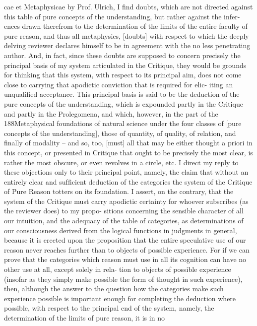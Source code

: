cae et Metaphysicae by Prof. Ulrich, I ﬁnd doubts, which are not directed against
this table of pure concepts of the understanding, but rather against the infer-
ences drawn therefrom to the determination of the limits of the entire faculty
of pure reason, and thus all metaphysics, [doubts] with respect to which the
deeply delving reviewer declares himself to be in agreement with the no less
penetrating author. And, in fact, since these doubts are supposed to concern
precisely the principal basis of my system articulated in the Critique, they would
be grounds for thinking that this system, with respect to its principal aim, does
not come close to carrying that apodictic conviction that is required for elic-
iting an unqualiﬁed acceptance. This principal basis is said to be the deduction
of the pure concepts of the understanding, which is expounded partly in the
Critique and partly in the Prolegomena, and which, however, in the part of the
188Metaphysical foundations of natural science
under the four classes of [pure concepts of the understanding], those of
quantity, of quality, of relation, and ﬁnally of modality – and so, too, [must]
all that may be either thought a priori in this concept, or presented in
Critique that ought to be precisely the most clear, is rather the most obscure,
or even revolves in a circle, etc. I direct my reply to these objections only to
their principal point, namely, the claim that without an entirely clear and sufﬁcient
deduction of the categories the system of the Critique of Pure Reason totters on its
foundation. I assert, on the contrary, that the system of the Critique must carry
apodictic certainty for whoever subscribes (as the reviewer does) to my propo-
sitions concerning the sensible character of all our intuition, and the adequacy
of the table of categories, as determinations of our consciousness derived from
the logical functions in judgments in general, because it is erected upon the
proposition that the entire speculative use of our reason never reaches further than to
objects of possible experience. For if we can prove that the categories which reason
must use in all its cognition can have no other use at all, except solely in rela-
tion to objects of possible experience (insofar as they simply make possible the
form of thought in such experience), then, although the answer to the question
how the categories make such experience possible is important enough for
completing the deduction where possible, with respect to the principal end of
the system, namely, the determination of the limits of pure reason, it is in no
